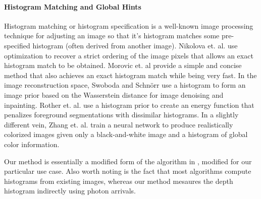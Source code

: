 \paragraph{Histogram Matching and Global Hints}
Histogram matching or histogram specification is a well-known image processing
technique \cite{Gonzalez2008} for adjusting an image so that it's histogram
matches some pre-specified histogram (often derived from another image).
Nikolova et. al. \cite{Nikolova2013} use optimization to recover a strict
ordering of the image pixels that allows an exact histogram match to be
obtained. Morovic et. al \cite{Morovic2002} provide a simple and concise method
that also achieves an exact histogram match while being very fast.
In the image reconstruction space, Swoboda and Schnörr \cite{Swoboda2013} use a
histogram to form an image prior based on the Wasserstein distance for image
denoising and inpainting. Rother et. al. \cite{Rother2006} use a histogram prior
to create an energy function that penalizes foreground segmentations with
dissimilar histograms. In a slightly different vein, Zhang et. al.
\cite{Zhang2017} train a neural network to produce realistically colorized
images given only a black-and-white image and a histogram of global color information.

Our method is essentially a modified form of the algorithm in
\cite{Morovic2002}, modified for our particular use case. Also worth noting is
the fact that most algorithms compute histograms from existing images, whereas
our method mesaures the depth histogram indirectly using photon arrivals.
%


